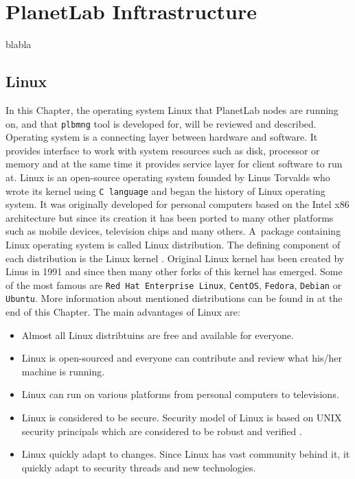 \section{PlanetLab Inftrastructure}
\label{section:plinfra}

blabla

\subsection{Linux}
\label{subsection:Linux}
In this Chapter, the operating system Linux that PlanetLab nodes are running on, and that \texttt{plbmng} tool is developed for, will be reviewed and described. Operating system is a connecting layer between hardware and software. It provides interface to work with system resources such as disk, processor or memory and at the same time it provides service layer for client software to run at. Linux is an open-source operating system founded by Linus Torvalds who wrote its kernel using \texttt{C language} and began the history of Linux operating system. It was originally developed for personal computers based on the Intel x86 architecture but since its creation it has been ported to many other platforms such as mobile devices, television chips and many others. A~package containing Linux operating system is called Linux distribution. The defining component of each distribution is the Linux kernel \cite{eckert2012linux+}. Original Linux kernel has been created by Linus in 1991 \cite{linuxintro} and since then many other forks of this kernel has emerged. Some of the most famous are \texttt{Red Hat Enterprise Linux},  \texttt{CentOS}, \texttt{Fedora}, \texttt{Debian} or \texttt{Ubuntu}. More information about mentioned distributions can be found in at the end of this Chapter. The main advantages of Linux are:
\begin{itemize}
	\item Almost all Linux distribtuins are free and available for everyone.
	\item Linux is open-sourced and everyone can contribute and review what his/her machine is running.
	\item Linux can run on various platforms from personal computers to televisions.
	\item Linux is considered to be secure. Security model of Linux is based on UNIX security principals which are considered to be robust and verified \cite{BILHEQP2xqVnjbQi}. 
	\item Linux quickly adapt to changes. Since Linux has vast community behind it, it quickly adapt to security threads and new technologies.
\end{itemize}
